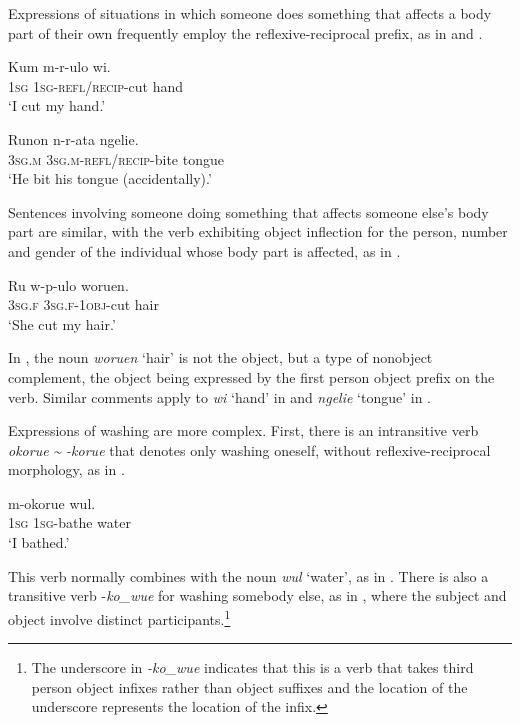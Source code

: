 \documentclass[output=paper]{langscibook}
\begin{document}
  Expressions of situations in which someone does something that affects a body part of their own frequently employ the reflexive-reciprocal prefix, as in  and .


\ea%
    \label{ex:Brown:20}
    \gll Kum  m-r-ulo  wi.\\
 \textsc{1sg}  \textsc{1sg}{}-\textsc{refl/recip}{}-cut  hand\\
    \glt ‘I cut my hand.’
    \z

\ea%
    \label{ex:Brown:21}
    \gll Runon  n-r-ata  ngelie.\\
 \textsc{3sg.m}  \textsc{3sg.m-refl/recip-}bite  tongue\\
    \glt ‘He bit his tongue (accidentally).’
    \z

Sentences involving someone doing something that affects someone else’s body part are similar, with the verb exhibiting object inflection for the person, number and gender of the individual whose body part is affected, as in .


\ea%
    \label{ex:Brown:22}
    \gll  Ru  w-p-ulo  woruen.\\
 \textsc{3sg.f}  \textsc{3sg.f}{}-\textsc{1obj}{}-cut  hair\\
    \glt  ‘She cut my hair.’
    \z

In , the noun \emph{woruen} ‘hair’ is not the object, but a type of nonobject complement, the object being expressed by the first person object prefix on the verb. Similar comments apply to \emph{wi} ‘hand’ in  and \emph{ngelie} ‘tongue’ in .

  Expressions of washing are more complex. First, there is an intransitive verb \emph{okorue} \emph{{\textasciitilde} -korue} that denotes only washing oneself, without reflexive-reciprocal morphology, as in .


\ea%
\label{ex:Brown:23}
      { m-okorue}  { wul.}\\
 { \textsc{1sg}}  { \textsc{1sg}{}-bathe}  { water}\\
    \glt ‘I bathed.’
    \z

This verb normally combines with the noun \emph{wul} ‘water’, as in . There is also a transitive verb -\emph{ko\_wue} for washing somebody else, as in , where the subject and object involve distinct participants.\footnote{  The underscore in \emph{{}-ko\_wue} indicates that this is a verb that takes third person object infixes rather than object suffixes and the location of the underscore represents the location of the infix.}
\end{document}
